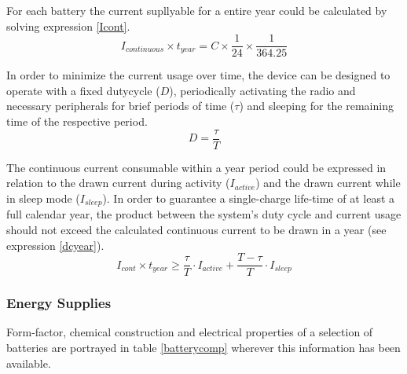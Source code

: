 For each battery the current supllyable for a entire year could be calculated 
by solving expression \ref{Icont}.
\begin{equation}
	\label{Icont}
	I_{continuous} \times t_{year} = C \times \frac{1}{24} \times \frac{1}{364.25}
\end{equation}

In order to minimize the current usage over time, the device can be designed 
to operate with a fixed dutycycle ($D$), periodically activating the radio 
and necessary peripherals for brief periods of time ($\tau$) and sleeping for 
the remaining time of the respective period.
\begin{equation}
	D = \frac{\tau}{T}
\end{equation}

The continuous current consumable within a year period could be expressed in
relation to the drawn current during activity ($I_{active}$) and the drawn 
current while in sleep mode ($I_{sleep}$). In order to guarantee a single-charge
life-time of at least a full calendar year, the product between the system's duty 
cycle and current usage should not exceed the calculated continuous current to
be drawn in a year (see expression \ref{dcyear}).
\begin{equation}
	\label{dcyear}
	I_{cont} \times t_{year} \geq \frac{\tau}{T}\cdot I_{active} + \frac{T - \tau}{T}\cdot I_{sleep}
\end{equation}

\subsubsection{Energy Supplies}
Form-factor, chemical construction and electrical properties of a selection of
batteries are portrayed in table \ref{batterycomp} wherever this information 
has been available. 

